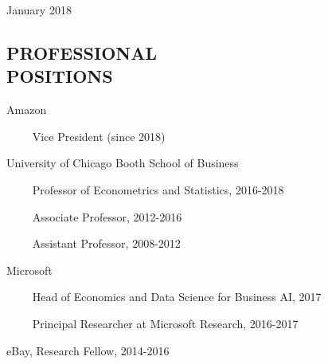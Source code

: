 \documentclass[margin,line]{res}
\begin{document}
\hfill {\sc January 2018}

\begin{resume}

\medskip



\medskip
\section{\bf PROFESSIONAL\\ POSITIONS}

{\sc Amazon}

\vspace{-.4cm}~~~~ Vice President (since 2018)


\vspace{-.275cm}

{\sc University of Chicago Booth School of Business}

\vspace{-.4cm}~~~~ Professor of Econometrics and Statistics, 2016-2018 

\vspace{-.4cm}~~~~ Associate Professor, 2012-2016


\vspace{-.4cm} ~~~~ Assistant Professor,  2008-2012


\vspace{-.275cm}
{\sc Microsoft}

\vspace{-.4cm}~~~~ Head of Economics and Data Science for Business AI, 2017

\vspace{-.4cm}~~~~ Principal Researcher at Microsoft Research, 2016-2017


\vspace{-.275cm}
{\sc eBay}, Research Fellow, 2014-2016


\end{resume}
\end{document}
